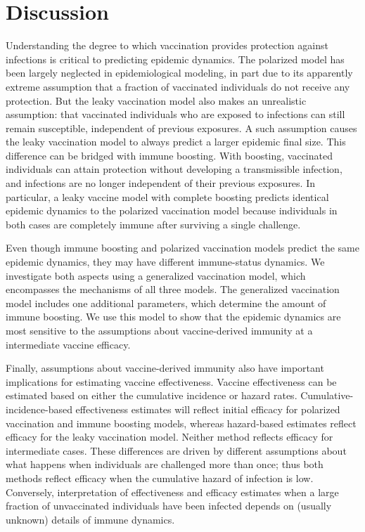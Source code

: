 \documentclass[12pt]{article}
\begin{document}
\section*{Discussion}

Understanding the degree to which vaccination provides protection against infections is critical to predicting epidemic dynamics.
The polarized model has been largely neglected in epidemiological modeling, in part due to its apparently extreme assumption that a fraction of vaccinated individuals do not receive any protection. 
But the leaky vaccination model also makes an unrealistic assumption: that vaccinated individuals who are exposed to infections can still remain susceptible, independent of previous exposures. 
A such assumption causes the leaky vaccination model to always predict a larger epidemic final size.
This difference can be bridged with immune boosting. With boosting, vaccinated individuals can attain protection without developing a transmissible infection, and infections are no longer independent of their previous exposures.
In particular, a leaky vaccine model with complete boosting predicts identical epidemic dynamics to the polarized vaccination model because individuals in both cases are completely immune after surviving a single challenge. 

Even though immune boosting and polarized vaccination models predict the same epidemic dynamics, they may have different immune-status dynamics.
We investigate both aspects using a generalized vaccination model, which encompasses the mechanisms of all three models.
The generalized vaccination model includes one additional parameters, which determine the amount of immune boosting.
We use this model to show that the epidemic dynamics are most sensitive to the assumptions about vaccine-derived immunity at a intermediate vaccine efficacy.

Finally, assumptions about vaccine-derived immunity also have important implications for estimating vaccine effectiveness.
Vaccine effectiveness can be estimated based on either the cumulative incidence or hazard rates.
Cumulative-incidence-based effectiveness estimates will reflect initial efficacy for polarized vaccination and immune boosting models,
whereas hazard-based estimates reflect efficacy for the leaky vaccination model.
Neither method reflects efficacy for intermediate cases.
These differences are driven by different assumptions about what happens when individuals are challenged more than once; thus both methods reflect efficacy when the cumulative hazard of infection is low. 
Conversely, interpretation of effectiveness and efficacy estimates when a large fraction of unvaccinated individuals have been infected depends on (usually unknown) details of immune dynamics.
\end{document}
